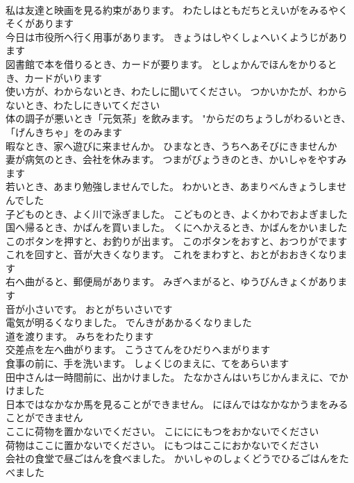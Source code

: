 \documentclass[8pt]{extreport}
\begin{document}
\begin{CJK}{UTF8}{min}
\\	私は友達と映画を見る約束があります。	わたしはともだちとえいがをみるやくそくがあります 
\\	今日は市役所へ行く用事があります。	きょうはしやくしょへいくようじがあります 
\\	図書館で本を借りるとき、カードが要ります。	としょかんでほんをかりるとき、カードがいります 
\\	使い方が、わからないとき、わたしに聞いてください。	つかいかたが、わからないとき、わたしにきいてください 
\\	体の調子が悪いとき「元気茶」を飲みます。	"からだのちょうしがわるいとき、「げんきちゃ」をのみます 
\\	暇なとき、家へ遊びに来ませんか。	ひまなとき、うちへあそびにきませんか 
\\	妻が病気のとき、会社を休みます。	つまがびょうきのとき、かいしゃをやすみます 
\\	若いとき、あまり勉強しませんでした。	わかいとき、あまりべんきょうしませんでした 
\\	子どものとき、よく川で泳ぎました。	こどものとき、よくかわでおよぎました 
\\	国へ帰るとき、かばんを買いました。	くにへかえるとき、かばんをかいました 
\\	このボタンを押すと、お釣りが出ます。	このボタンをおすと、おつりがでます 
\\	これを回すと、音が大きくなります。	これをまわすと、おとがおおきくなります 
\\	右へ曲がると、郵便局があります。	みぎへまがると、ゆうびんきょくがあります 
\\	音が小さいです。	おとがちいさいです 
\\	電気が明るくなりました。	でんきがあかるくなりました 
\\	道を渡ります。	みちをわたります 
\\	交差点を左へ曲がります。	こうさてんをひだりへまがります 
\\	食事の前に、手を洗います。	しょくじのまえに、てをあらいます 
\\	田中さんは一時間前に、出かけました。	たなかさんはいちじかんまえに、でかけました 
\\	日本ではなかなか馬を見ることができません。	にほんではなかなかうまをみることができません 
\\	ここに荷物を置かないでください。	こにににもつをおかないでください 
\\	荷物はここに置かないでください。	にもつはここにおかないでください 
\\	会社の食堂で昼ごはんを食べました。	かいしゃのしょくどうでひるごはんをたべました 

\end{CJK}
\end{document}
